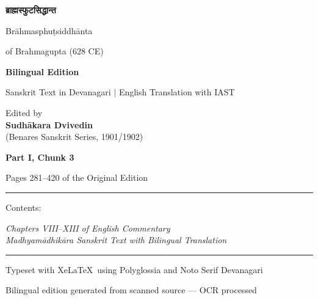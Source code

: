 \documentclass[11pt,a4paper]{article}
\providecommand{\XeLaTeX}{XeLaTeX}
\newcommand{\shortline}{\noindent\rule{0.5\textwidth}{0.4pt}\par}
\newcommand{\dev}[1]{{\devanagarifont #1}}
\theoremstyle{definition}
\begin{document}
\begin{titlepage}
\centering
\vspace*{1.5cm}

{\color{titlecolor}\Huge\bfseries\dev{ब्राह्मस्फुटसिद्धान्त}}

\vspace{0.4cm}
{\Large\color{sectioncolor} Br\=ahmasphu\d{t}siddh\=anta}

\vspace{0.3cm}
{\large\color{sectioncolor} of Brahmagupta (628 CE)}

\vspace{1.5cm}
{\LARGE\bfseries Bilingual Edition}

\vspace{0.5cm}
{\large Sanskrit Text in Devanagari $\vert$ English Translation with IAST}

\vspace{2cm}
{\large Edited by\\[0.3cm]
\textbf{Sudh\=akara Dvivedin}\\[0.2cm]
(Benares Sanskrit Series, 1901/1902)}

\vspace{1.5cm}
{\Large\bfseries\color{sectioncolor} Part I, Chunk 3}

\vspace{0.3cm}
{\large Pages 281--420 of the Original Edition}

\vspace{0.5cm}
\shortline

\vspace{0.4cm}
{\normalsize Contents:}

\vspace{0.3cm}
\begin{minipage}{0.85\textwidth}
\centering
\textit{Chapters VIII--XIII of English Commentary}\\[0.15cm]
\textit{Madhyam\=adhik\=ara Sanskrit Text with Bilingual Translation}
\end{minipage}

\vspace{0.5cm}
\shortline

\vspace{0.4cm}
{\small Typeset with \XeLaTeX\ using Polyglossia and Noto Serif Devanagari}

\vfill
{\small Bilingual edition generated from scanned source --- OCR processed}

\end{titlepage}
\end{document}
